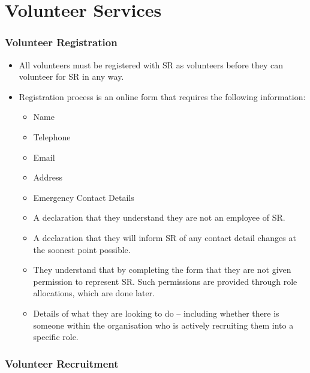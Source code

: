 \chapter{Volunteer Services}



\subsection{Volunteer Registration}

\begin{itemize}
\item All volunteers must be registered with SR as volunteers before they can volunteer for SR in any way.
\item Registration process is an online form that requires the following information:
  \begin{itemize}
  \item Name
  \item Telephone
  \item Email
  \item Address
  \item Emergency Contact Details
  \item A declaration that they understand they are not an employee of SR.
  \item A declaration that they will inform SR of any contact detail changes at the soonest point possible.
  \item They understand that by completing the form that they are not given permission to represent SR.  Such permissions are provided through role allocations, which are done later.
  \item Details of what they are looking to do -- including whether there is someone within the organisation who is actively recruiting them into a specific role.
  \end{itemize}
\end{itemize}

\subsection{Volunteer Recruitment}

